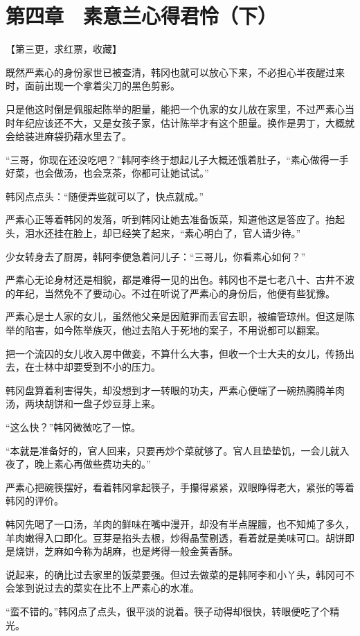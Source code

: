 \section{第四章　素意兰心得君怜（下）}

【第三更，求红票，收藏】

既然严素心的身份家世已被查清，韩冈也就可以放心下来，不必担心半夜醒过来时，面前出现一个拿着尖刀的黑色剪影。

只是他这时倒是佩服起陈举的胆量，能把一个仇家的女儿放在家里，不过严素心当时年纪应该还不大，又是女孩子家，估计陈举才有这个胆量。换作是男丁，大概就会给装进麻袋扔藉水里去了。

“三哥，你现在还没吃吧？”韩阿李终于想起儿子大概还饿着肚子，“素心做得一手好菜，也会做汤，也会烹茶，你都可让她试试。”

韩冈点点头：“随便弄些就可以了，快点就成。”

严素心正等着韩冈的发落，听到韩冈让她去准备饭菜，知道他这是答应了。抬起头，泪水还挂在脸上，却已经笑了起来，“素心明白了，官人请少待。”

少女转身去了厨房，韩阿李便急着问儿子：“三哥儿，你看素心如何？”

严素心无论身材还是相貌，都是难得一见的出色。韩冈也不是七老八十、古井不波的年纪，当然免不了要动心。不过在听说了严素心的身份后，他便有些犹豫。

严素心是士人家的女儿，虽然他父亲是因赃罪而丢官去职，被编管琼州。但这是陈举的陷害，如今陈举族灭，他过去陷人于死地的案子，不用说都可以翻案。

把一个流囚的女儿收入房中做妾，不算什么大事，但收一个士大夫的女儿，传扬出去，在士林中却要受到不小的压力。

韩冈盘算着利害得失，却没想到才一转眼的功夫，严素心便端了一碗热腾腾羊肉汤，两块胡饼和一盘子炒豆芽上来。

“这么快？”韩冈微微吃了一惊。

“本就是准备好的，官人回来，只要再炒个菜就够了。官人且垫垫饥，一会儿就入夜了，晚上素心再做些费功夫的。”

严素心把碗筷摆好，看着韩冈拿起筷子，手攥得紧紧，双眼睁得老大，紧张的等着韩冈的评价。

韩冈先喝了一口汤，羊肉的鲜味在嘴中漫开，却没有半点腥膻，也不知炖了多久，羊肉嫩得入口即化。豆芽是掐头去根，炒得晶莹剔透，看着就是美味可口。胡饼即是烧饼，芝麻如今称为胡麻，也是烤得一般金黄香酥。

说起来，的确比过去家里的饭菜要强。但过去做菜的是韩阿李和小丫头，韩冈可不会笨到说过去的菜实在比不上严素心的水准。

“蛮不错的。”韩冈点了点头，很平淡的说着。筷子动得却很快，转眼便吃了个精光。

